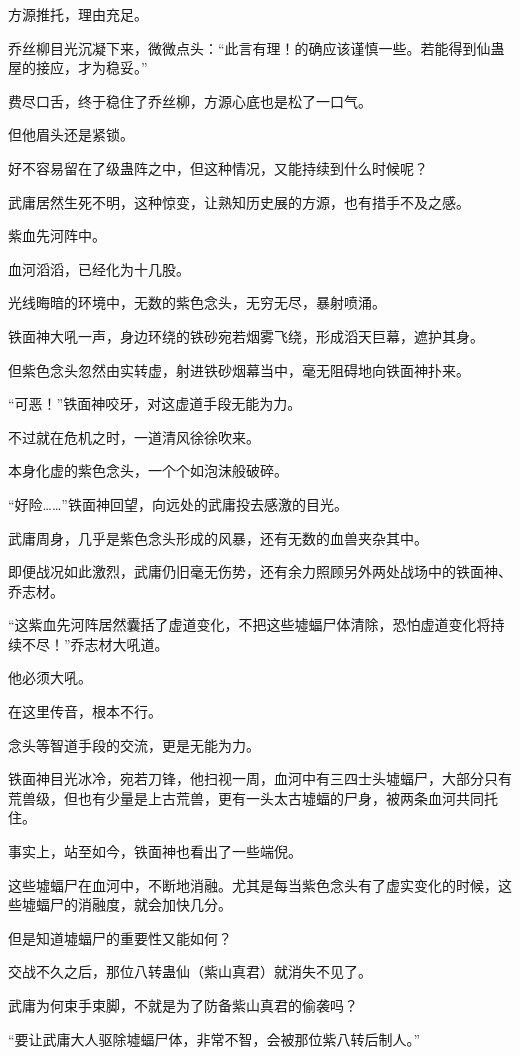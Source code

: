 \begin{this_body}
方源推托，理由充足。

乔丝柳目光沉凝下来，微微点头：“此言有理！的确应该谨慎一些。若能得到仙蛊屋的接应，才为稳妥。”

费尽口舌，终于稳住了乔丝柳，方源心底也是松了一口气。

但他眉头还是紧锁。

好不容易留在了级蛊阵之中，但这种情况，又能持续到什么时候呢？

武庸居然生死不明，这种惊变，让熟知历史展的方源，也有措手不及之感。

紫血先河阵中。

血河滔滔，已经化为十几股。

光线晦暗的环境中，无数的紫色念头，无穷无尽，暴射喷涌。

铁面神大吼一声，身边环绕的铁砂宛若烟雾飞绕，形成滔天巨幕，遮护其身。

但紫色念头忽然由实转虚，射进铁砂烟幕当中，毫无阻碍地向铁面神扑来。

“可恶！”铁面神咬牙，对这虚道手段无能为力。

不过就在危机之时，一道清风徐徐吹来。

本身化虚的紫色念头，一个个如泡沫般破碎。

“好险……”铁面神回望，向远处的武庸投去感激的目光。

武庸周身，几乎是紫色念头形成的风暴，还有无数的血兽夹杂其中。

即便战况如此激烈，武庸仍旧毫无伤势，还有余力照顾另外两处战场中的铁面神、乔志材。

“这紫血先河阵居然囊括了虚道变化，不把这些墟蝠尸体清除，恐怕虚道变化将持续不尽！”乔志材大吼道。

他必须大吼。

在这里传音，根本不行。

念头等智道手段的交流，更是无能为力。

铁面神目光冰冷，宛若刀锋，他扫视一周，血河中有三四士头墟蝠尸，大部分只有荒兽级，但也有少量是上古荒兽，更有一头太古墟蝠的尸身，被两条血河共同托住。

事实上，站至如今，铁面神也看出了一些端倪。

这些墟蝠尸在血河中，不断地消融。尤其是每当紫色念头有了虚实变化的时候，这些墟蝠尸的消融度，就会加快几分。

但是知道墟蝠尸的重要性又能如何？

交战不久之后，那位八转蛊仙（紫山真君）就消失不见了。

武庸为何束手束脚，不就是为了防备紫山真君的偷袭吗？

“要让武庸大人驱除墟蝠尸体，非常不智，会被那位紫八转后制人。”


\end{this_body}
